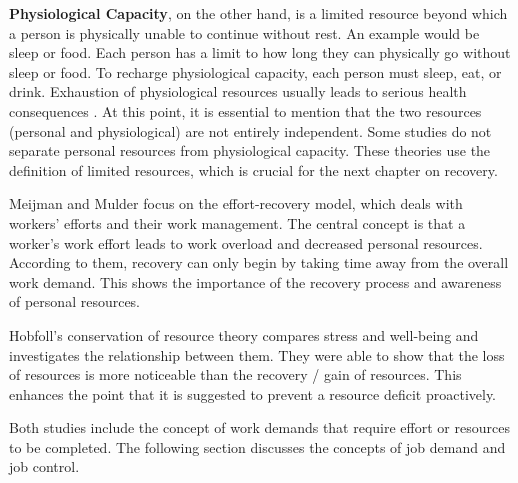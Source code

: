 \documentclass{hasel_thesis}
\begin{document}
\textbf{Physiological Capacity}, on the other hand, is a limited resource beyond which a person is physically unable to continue without rest. An example would be sleep or food. Each person has a limit to how long they can physically go without sleep or food. To recharge physiological capacity, each person must sleep, eat, or drink. Exhaustion of physiological resources usually leads to serious health consequences \cite{Trougakos.2009}. At this point, it is essential to mention that the two resources (personal and physiological) are not entirely independent.
Some studies \cite{Meijman.1998,Hobfoll.1989, Hobfoll.1998} do not separate personal resources from physiological capacity. These theories use the definition of limited resources, which is crucial for the next chapter on recovery.

Meijman and Mulder \cite{Meijman.1998} focus on the effort-recovery model, which deals with workers' efforts and their work management. The central concept is that a worker's work effort leads to work overload and decreased personal resources. According to them, recovery can only begin by taking time away from the overall work demand. This shows the importance of the recovery process and awareness of personal resources.

Hobfoll's \cite{Hobfoll.1989, Hobfoll.1998} conservation of resource theory compares stress and well-being and investigates the relationship between them. They were able to show that the loss of resources is more noticeable than the recovery / gain of resources. This enhances the point that it is suggested to prevent a resource deficit proactively.

Both studies include the concept of work demands that require effort or resources to be completed. The following section discusses the concepts of job demand and job control.
\end{document}
